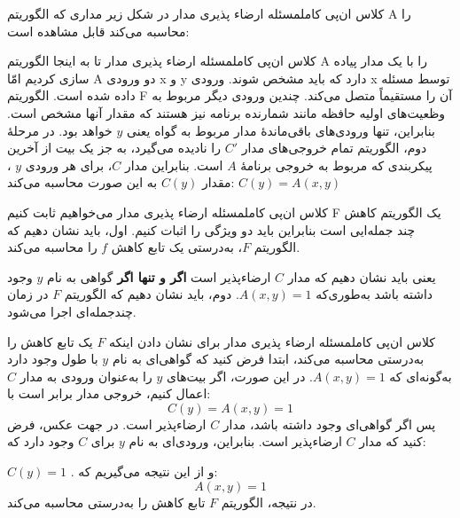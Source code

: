 \begin{itemframe-s}{کلاس ان‌پی کامل}{مسئله ارضاء پذیری مدار}
\itm
در شکل زیر مداری که الگوریتم A را محاسبه می‌کند قابل مشاهده است:

\end{itemframe-s}

\begin{itemframe-s}{کلاس ان‌پی کامل}{مسئله ارضاء پذیری مدار}
\itm
تا به اینجا الگوریتم A را با یک مدار پیاده سازی کردیم امّا A دو ورودی x و y دارد که باید مشخص شوند. ورودی x توسط مسئله داده شده است. الگوریتم F آن را مستقیماً متصل می‌کند. چندین ورودی دیگر مربوط به وظعیت‌های اولیه حافظه مانند شمارنده برنامه نیز هستند که مقدار آنها مشخص است.
\itm
بنابراین، تنها ورودی‌های باقی‌ماندهٔ مدار مربوط به گواه یعنی $y$ خواهد بود.
\itm
در مرحلهٔ دوم، الگوریتم تمام خروجی‌های مدار $C'$ را نادیده می‌گیرد، به جز یک بیت از آخرین پیکربندی که مربوط به خروجی برنامهٔ $A$ است.
\itm
بنابراین مدار $C$، برای هر ورودی $y$ ، مقدار $C(y)$ به این صورت محاسبه می‌کند:
$C(y) = A(x, y)$
\end{itemframe-s}

\begin{itemframe-s}{کلاس ان‌پی کامل}{مسئله ارضاء پذیری مدار}
\itm
می‌خواهیم ثابت کنیم F یک الگوریتم کاهش چند جمله‌ایی است بنابراین باید دو ویژگی را اثبات کنیم.
\itm
اول، باید نشان دهیم که الگوریتم $F$، به‌درستی یک تابع کاهش $f$ را محاسبه می‌کند.

یعنی باید نشان دهیم که مدار $C$ ارضاء‌پذیر است \textbf{اگر و تنها اگر} گواهی به نام $y$ وجود داشته باشد به‌طوری‌که
$A(x, y) = 1$.
\itm
دوم، باید نشان دهیم که الگوریتم $F$ در زمان چندجمله‌ای اجرا می‌شود.
\end{itemframe-s}

\begin{itemframe-s}{کلاس ان‌پی کامل}{مسئله ارضاء پذیری مدار}
\itm
برای نشان دادن اینکه $F$ یک تابع کاهش را به‌درستی محاسبه می‌کند، ابتدا فرض کنید که گواهی‌ای به نام $y$ با طول وجود دارد به‌گونه‌ای که
$A(x, y) = 1$.
در این صورت، اگر بیت‌های $y$ را به‌عنوان ورودی به مدار $C$ اعمال کنیم، خروجی مدار برابر است با:
$$
C(y) = A(x, y) = 1
$$
پس اگر گواهی‌ای وجود داشته باشد، مدار $C$ ارضاء‌پذیر است.
\itm
در جهت عکس، فرض کنید که مدار $C$ ارضاءپذیر است. بنابراین، ورودی‌ای به نام $y$ برای $C$ وجود دارد که:

$C(y)=1$ .
و از این نتیجه می‌گیریم که:
$$A(x,y)=1$$
\itm
در نتیجه، الگوریتم $F$ تابع کاهش را به‌درستی محاسبه می‌کند.
\end{itemframe-s}

